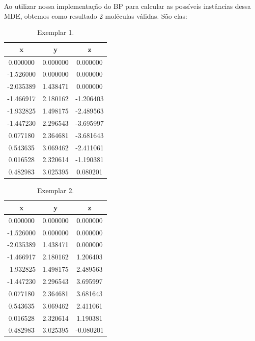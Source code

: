 \documentclass[a4paper,12pt]{article}
\begin{document}
	Ao utilizar nossa implementação do BP para calcular as possíveis instâncias dessa MDE, obtemos como resultado 2 moléculas válidas. São elas:
	
	\begin{center}
		\begin{minipage}{0.45 \linewidth}
			\begin{table}[H]
				\centering
				\begin{tabular}{ |c c c| } 
					\hline
					\textbf{x} & \textbf{y} & \textbf{z} \\\hline
					0.000000 & 0.000000 & 0.000000\\
					-1.526000 & 0.000000 & 0.000000\\
					-2.035389 & 1.438471 & 0.000000\\
					-1.466917 & 2.180162 & -1.206403\\
					-1.932825 & 1.498175 & -2.489563\\
					-1.447230 & 2.296543 & -3.695997\\
					0.077180 & 2.364681 & -3.681643\\
					0.543635 & 3.069462 & -2.411061\\
					0.016528 & 2.320614 & -1.190381\\
					0.482983 & 3.025395 & 0.080201\\\hline
				\end{tabular}
				\caption{Exemplar 1.}
				\label{tab:re1}
			\end{table}
		\end{minipage}
		\begin{minipage}{0.45 \linewidth}
			\begin{table}[H]
				\centering
				\begin{tabular}{ |c c c| } 
					\hline
					\textbf{x} & \textbf{y} & \textbf{z} \\\hline
					0.000000 & 0.000000 & 0.000000\\
					-1.526000 & 0.000000 & 0.000000\\
					-2.035389 & 1.438471 & 0.000000\\
					-1.466917 & 2.180162 & 1.206403\\
					-1.932825 & 1.498175 & 2.489563\\
					-1.447230 & 2.296543 & 3.695997\\
					0.077180 & 2.364681 & 3.681643\\
					0.543635 & 3.069462 & 2.411061\\
					0.016528 & 2.320614 & 1.190381\\
					0.482983 & 3.025395 & -0.080201\\\hline
				\end{tabular}
				\caption{Exemplar 2.}
				\label{tab:re2}
			\end{table}
		\end{minipage}
	\end{center}
\end{document}

